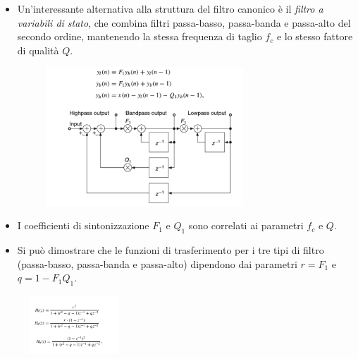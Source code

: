 \begin{itemize}
    \item Un'interessante alternativa alla struttura del filtro canonico è il \textit{filtro a variabili di stato}, che combina filtri passa-basso, passa-banda e passa-alto del secondo ordine, mantenendo la stessa frequenza di taglio $f_c$ e lo stesso fattore di qualità $Q$.

    \begin{figure}[H]
        \centering
        \includegraphics[width=0.7\textwidth]{capitoli/capitolo15/immagini/image4.png}
    \end{figure}

    \item I coefficienti di sintonizzazione $F_1$ e $Q_1$ sono correlati ai parametri $f_c$ e $Q$.

    \item Si può dimostrare che le funzioni di trasferimento per i tre tipi di filtro (passa-basso, passa-banda e passa-alto) dipendono dai parametri $r = F_1$ e $q = 1 - F_1 Q_1$.
\end{itemize}
\begin{figure}[H]
    \centering
    \includegraphics[width=0.3\textwidth]{capitoli/capitolo15/immagini/image5.png}
\end{figure}

